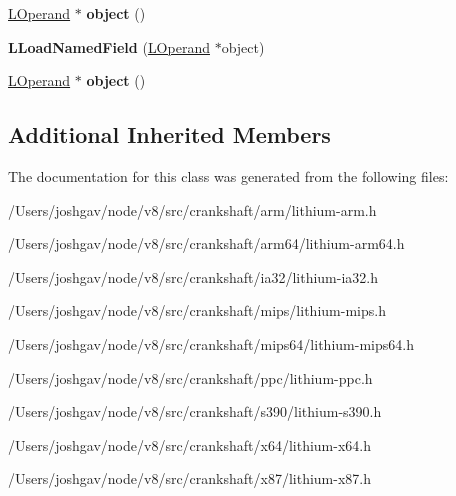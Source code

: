 \begin{DoxyCompactItemize}
\item 
\hyperlink{classv8_1_1internal_1_1_l_operand}{L\+Operand} $\ast$ {\bfseries object} ()\hypertarget{classv8_1_1internal_1_1_l_load_named_field_a212567520f892c2f0f0e6620ee2fdbed}{}\label{classv8_1_1internal_1_1_l_load_named_field_a212567520f892c2f0f0e6620ee2fdbed}

\item 
{\bfseries L\+Load\+Named\+Field} (\hyperlink{classv8_1_1internal_1_1_l_operand}{L\+Operand} $\ast$object)\hypertarget{classv8_1_1internal_1_1_l_load_named_field_a25a4e6f02cb49c16de3d80b06df1c30a}{}\label{classv8_1_1internal_1_1_l_load_named_field_a25a4e6f02cb49c16de3d80b06df1c30a}

\item 
\hyperlink{classv8_1_1internal_1_1_l_operand}{L\+Operand} $\ast$ {\bfseries object} ()\hypertarget{classv8_1_1internal_1_1_l_load_named_field_a212567520f892c2f0f0e6620ee2fdbed}{}\label{classv8_1_1internal_1_1_l_load_named_field_a212567520f892c2f0f0e6620ee2fdbed}

\end{DoxyCompactItemize}
\subsection*{Additional Inherited Members}


The documentation for this class was generated from the following files\+:\begin{DoxyCompactItemize}
\item 
/\+Users/joshgav/node/v8/src/crankshaft/arm/lithium-\/arm.\+h\item 
/\+Users/joshgav/node/v8/src/crankshaft/arm64/lithium-\/arm64.\+h\item 
/\+Users/joshgav/node/v8/src/crankshaft/ia32/lithium-\/ia32.\+h\item 
/\+Users/joshgav/node/v8/src/crankshaft/mips/lithium-\/mips.\+h\item 
/\+Users/joshgav/node/v8/src/crankshaft/mips64/lithium-\/mips64.\+h\item 
/\+Users/joshgav/node/v8/src/crankshaft/ppc/lithium-\/ppc.\+h\item 
/\+Users/joshgav/node/v8/src/crankshaft/s390/lithium-\/s390.\+h\item 
/\+Users/joshgav/node/v8/src/crankshaft/x64/lithium-\/x64.\+h\item 
/\+Users/joshgav/node/v8/src/crankshaft/x87/lithium-\/x87.\+h\end{DoxyCompactItemize}
